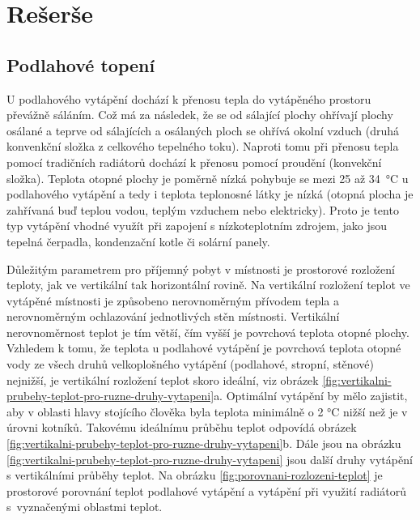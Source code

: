 

\chapter{Rešerše}


\section{Podlahové topení}

U podlahového vytápění dochází k přenosu tepla do vytápěného prostoru převážně sáláním. Což má za následek, že se od sálající plochy ohřívají plochy osálané a teprve od sálajících a osálaných ploch se ohřívá okolní vzduch (druhá konvenkční složka z celkového tepelného toku). Naproti tomu při přenosu tepla pomocí tradičních radiátorů dochází k přenosu pomocí proudění (konvekční složka). 
Teplota otopné plochy je poměrně nízká pohybuje se mezi 25 až 34~°C u podlahového vytápění a tedy i teplota teplonosné látky je nízká (otopná plocha je zahřívaná buď teplou vodou, teplým vzduchem nebo elektricky). Proto je tento typ vytápění vhodné využít při zapojení s nízkoteplotním zdrojem, jako jsou tepelná čerpadla, kondenzační kotle či solární panely.

Důležitým parametrem pro příjemný pobyt v místnosti je prostorové rozložení teploty, jak ve vertikální tak horizontální rovině. Na vertikální rozložení teplot ve vytápěné místnosti je způsobeno nerovnoměrným přívodem tepla a nerovnoměrným ochlazování jednotlivých stěn místnosti. Vertikální nerovnoměrnost teplot je tím větší, čím vyšší je povrchová teplota otopné plochy. Vzhledem k tomu, že teplota u podlahové vytápění je povrchová teplota otopné vody ze všech druhů velkoplošného vytápění (podlahové, stropní, stěnové) nejnižší, je vertikální rozložení teplot skoro ideální, viz obrázek \ref{fig:vertikalni-prubehy-teplot-pro-ruzne-druhy-vytapeni}a. Optimální vytápění by mělo zajistit, aby v oblasti hlavy stojícího člověka byla teplota minimálně o 2 °C nižší než je v úrovni kotníků. Takovému ideálnímu průběhu teplot odpovídá obrázek \ref{fig:vertikalni-prubehy-teplot-pro-ruzne-druhy-vytapeni}b. Dále jsou na obrázku  \ref{fig:vertikalni-prubehy-teplot-pro-ruzne-druhy-vytapeni} jsou další druhy vytápění s vertikálními průběhy teplot. Na obrázku \ref{fig:porovnani-rozlozeni-teplot} je prostorové porovnání teplot podlahové vytápění a vytápění při využití radiátorů s~vyznačenými oblastmi teplot.


